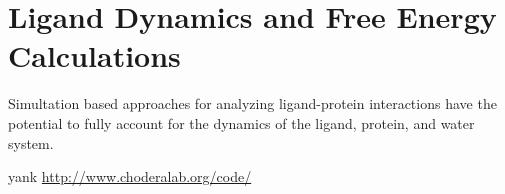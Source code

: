 \section{Ligand Dynamics and Free Energy Calculations}
  
Simultation based approaches for analyzing ligand-protein interactions have the potential to fully account for the dynamics of the ligand, protein, and water system.

yank \url{http://www.choderalab.org/code/}